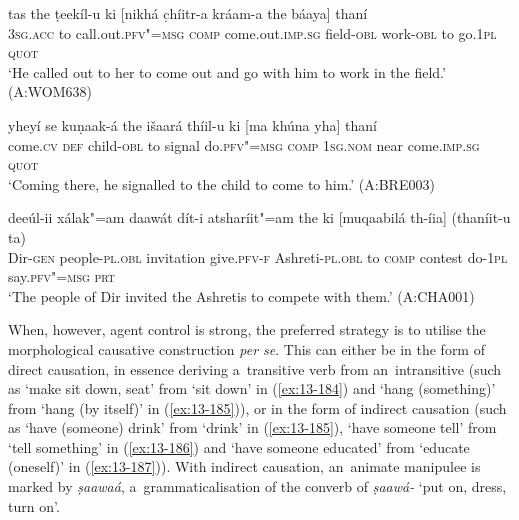 \begin{exe}
\ex
\label{ex:13-181}
\gll tas the ṭeekíl-u ki [nikhá c̣híitr-a  kráam-a the báaya] thaní \\
\textsc{3sg.acc} to call.out.\textsc{pfv"=msg} \textsc{comp} come.out.\textsc{imp.sg} field-\textsc{obl}  work-\textsc{obl} to go.\textsc{1pl} \textsc{quot} \\
\glt `He called out to her to come out and go with him to work in the field.' (A:WOM638)

\ex
\label{ex:13-182}
\gll yheyí se kuṇaak-á the išaará thíil-u  ki [ma khúna yha] thaní \\
come.\textsc{cv} \textsc{def} child-\textsc{obl} to signal do.\textsc{pfv"=msg} \textsc{comp} \textsc{1sg.nom} near come.\textsc{imp.sg} \textsc{quot} \\
\glt `Coming there, he signalled to the child to come to him.' (A:BRE003)

\ex
\label{ex:13-183}
\gll deeúl-ii xálak"=am daawát dít-i  atsharíit"=am the ki [muqaabilá
  th-íia]  (thaníit-u ta) \\
Dir-\textsc{gen}  people-\textsc{pl.obl} invitation give.\textsc{pfv-f} Ashreti-\textsc{pl.obl} to \textsc{comp} contest do-\textsc{1pl} say.\textsc{pfv"=msg} \textsc{prt} \\
\glt `The people of Dir invited the Ashretis to compete with them.' (A:CHA001) 
\end{exe}

When, however, agent control is strong, the preferred strategy is to utilise the morphological causative construction \textit{per se}. This can either be in the form of direct causation, in essence deriving a~transitive verb from an~intransitive (such as `make sit down, seat' from `sit down' in (\ref{ex:13-184}) and `hang (something)' from `hang (by itself)' in (\ref{ex:13-185})), or in the form of indirect causation (such as `have (someone) drink' from `drink' in (\ref{ex:13-185}), `have someone tell' from `tell something' in (\ref{ex:13-186}) and `have someone educated' from `educate (oneself)' in (\ref{ex:13-187})). With indirect causation, an~animate manipulee is marked by \textit{ṣaawaá}, a~grammaticalisation of the converb of \textit{ṣaawá-} `put on, dress, turn on'.

